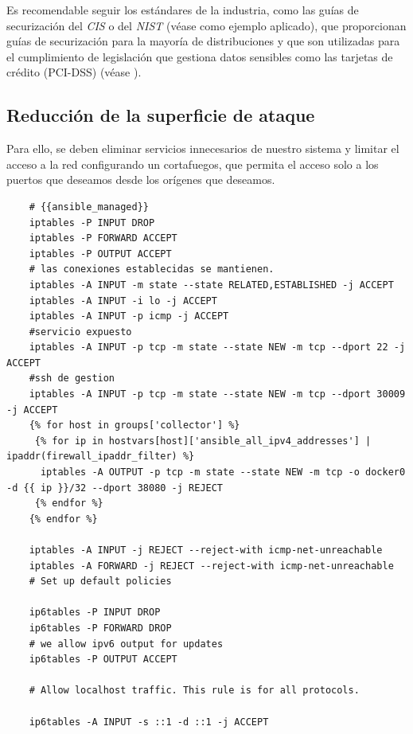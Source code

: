 Es recomendable seguir los estándares de la industria, como las guías de securización del \emph{CIS} o del 
\emph{NIST} (véase \cite{ovh-debian-cis} como ejemplo aplicado), que proporcionan guías de securización
para la mayoría de distribuciones y que son utilizadas para el cumplimiento de legislación que
gestiona datos sensibles como las tarjetas de crédito (PCI-DSS) (véase \cite{wiki-pci-dss}). 

\subsection{Reducción de la superficie de ataque}

Para ello, se deben eliminar servicios innecesarios de nuestro sistema y limitar el acceso a la red configurando un cortafuegos, que permita
el acceso solo a los puertos que deseamos desde los orígenes que deseamos.

\begin{verbatim}
    # {{ansible_managed}}
    iptables -P INPUT DROP
    iptables -P FORWARD ACCEPT
    iptables -P OUTPUT ACCEPT
    # las conexiones establecidas se mantienen.
    iptables -A INPUT -m state --state RELATED,ESTABLISHED -j ACCEPT
    iptables -A INPUT -i lo -j ACCEPT
    iptables -A INPUT -p icmp -j ACCEPT
    #servicio expuesto
    iptables -A INPUT -p tcp -m state --state NEW -m tcp --dport 22 -j ACCEPT
    #ssh de gestion
    iptables -A INPUT -p tcp -m state --state NEW -m tcp --dport 30009 -j ACCEPT
    {% for host in groups['collector'] %}
     {% for ip in hostvars[host]['ansible_all_ipv4_addresses'] | ipaddr(firewall_ipaddr_filter) %}
      iptables -A OUTPUT -p tcp -m state --state NEW -m tcp -o docker0 -d {{ ip }}/32 --dport 38080 -j REJECT
     {% endfor %}
    {% endfor %}
    
    iptables -A INPUT -j REJECT --reject-with icmp-net-unreachable 
    iptables -A FORWARD -j REJECT --reject-with icmp-net-unreachable     
    # Set up default policies
    
    ip6tables -P INPUT DROP
    ip6tables -P FORWARD DROP
    # we allow ipv6 output for updates
    ip6tables -P OUTPUT ACCEPT
    
    # Allow localhost traffic. This rule is for all protocols.
    
    ip6tables -A INPUT -s ::1 -d ::1 -j ACCEPT
\end{verbatim}
\bigskip

